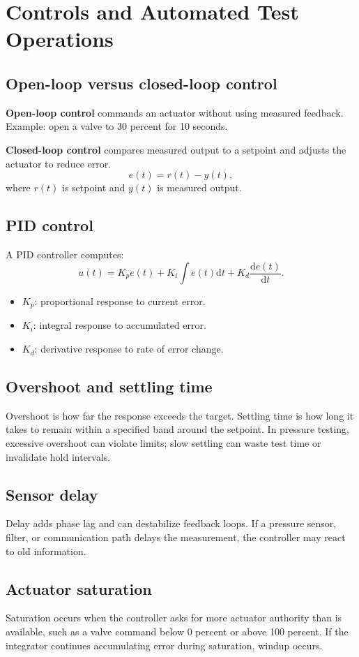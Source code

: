 \documentclass[11pt]{article}
\newcommand{\dd}{\mathrm{d}}
\begin{document}
\section{Controls and Automated Test Operations}

\subsection{Open-loop versus closed-loop control}
\textbf{Open-loop control} commands an actuator without using measured feedback.
Example: open a valve to 30 percent for 10 seconds.

\textbf{Closed-loop control} compares measured output to a setpoint and adjusts
the actuator to reduce error.
\[
e(t)=r(t)-y(t),
\]
where \(r(t)\) is setpoint and \(y(t)\) is measured output.

\subsection{PID control}
A PID controller computes:
\[
u(t)=K_p e(t)+K_i\int e(t)\dd t+K_d\frac{\dd e(t)}{\dd t}.
\]
\begin{itemize}
  \item \(K_p\): proportional response to current error.
  \item \(K_i\): integral response to accumulated error.
  \item \(K_d\): derivative response to rate of error change.
\end{itemize}

\subsection{Overshoot and settling time}
Overshoot is how far the response exceeds the target. Settling time is how long
it takes to remain within a specified band around the setpoint. In pressure
testing, excessive overshoot can violate limits; slow settling can waste test
time or invalidate hold intervals.

\subsection{Sensor delay}
Delay adds phase lag and can destabilize feedback loops. If a pressure sensor,
filter, or communication path delays the measurement, the controller may react
to old information.

\subsection{Actuator saturation}
Saturation occurs when the controller asks for more actuator authority than is
available, such as a valve command below 0 percent or above 100 percent. If the
integrator continues accumulating error during saturation, windup occurs.
\end{document}
